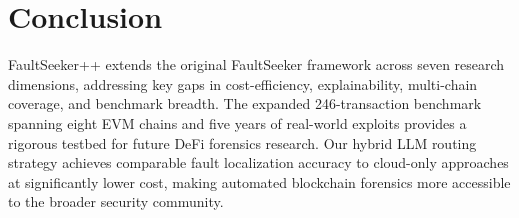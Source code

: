 \documentclass[conference]{IEEEtran}
\begin{document}
\section{Conclusion}
\label{sec:conclusion}

FaultSeeker++ extends the original FaultSeeker framework across seven
research dimensions, addressing key gaps in cost-efficiency,
explainability, multi-chain coverage, and benchmark breadth.
The expanded 246-transaction benchmark spanning eight EVM chains and
five years of real-world exploits provides a rigorous testbed for
future DeFi forensics research.
Our hybrid LLM routing strategy achieves comparable fault localization
accuracy to cloud-only approaches at significantly lower cost, making
automated blockchain forensics more accessible to the broader
security community.
\end{document}
